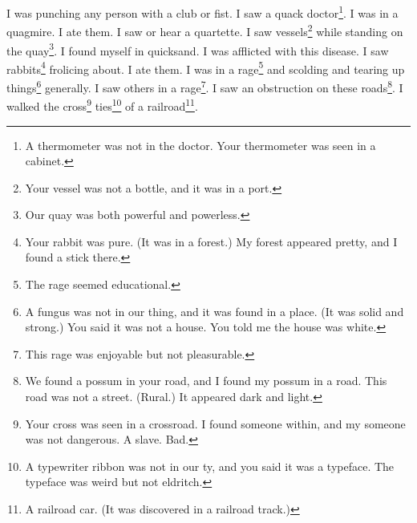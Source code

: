 \documentclass[12pt]{book}
\begin{document}
 I was punching any person with a club or fist. I saw a quack doctor\footnote{A thermometer was not in the doctor. Your thermometer was seen in a cabinet.}. I was in a quagmire. I ate them. I saw or hear a quartette. I saw vessels\footnote{Your vessel was not a bottle, and it was in a port.} while standing on the quay\footnote{Our quay was both powerful and powerless.}. I found myself in quicksand. I was afflicted with this disease. I saw rabbits\footnote{Your rabbit was pure. (It was in a forest.) My forest appeared pretty, and I found a stick there.} frolicing about. I ate them. I was in a rage\footnote{The rage seemed educational.} and scolding and tearing up things\footnote{A fungus was not in our thing, and it was found in a place. (It was solid and strong.) You said it was not a house. You told me the house was white.} generally. I saw others in a rage\footnote{This rage was enjoyable but not pleasurable.}. I saw an obstruction on these roads\footnote{We found a possum in your road, and I found my possum in a road. This road was not a street. (Rural.) It appeared dark and light.}. I walked the cross\footnote{Your cross was seen in a crossroad. I found someone within, and my someone was not dangerous. A slave. Bad.} ties\footnote{A typewriter ribbon was not in our ty, and you said it was a typeface. The typeface was weird but not eldritch.} of a railroad\footnote{A railroad car. (It was discovered in a railroad track.)}. 
\end{document}
